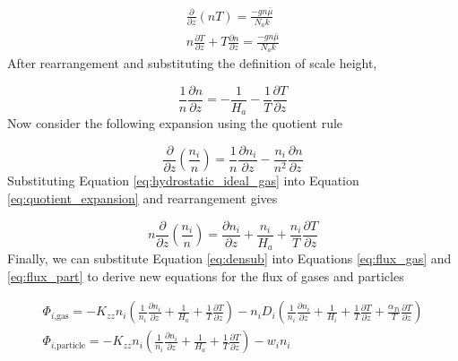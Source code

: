 \begin{gather}
  \frac{\partial}{\partial z} (n T) = \frac{-g n \bar \mu}{N_a k} \\
  n \frac{\partial T}{\partial z} + T \frac{\partial n}{\partial z} = \frac{-g n \bar \mu}{N_a k}
\end{gather}
After rearrangement and substituting the definition of scale height,

\begin{equation}
  \frac{1}{n} \frac{\partial n}{\partial z} = - \frac{1}{H_a} - \frac{1}{T} \frac{\partial T}{\partial z} \label{eq:hydrostatic_ideal_gas}
\end{equation}
Now consider the following expansion using the quotient rule

\begin{equation}
  \frac{\partial }{\partial z} \left(\frac{n_i}{n}\right) = \frac{1}{n} \frac{\partial n_i}{\partial z} - \frac{n_i}{n^2} \frac{\partial n}{\partial z} \label{eq:quotient_expansion}
\end{equation}
Substituting Equation \eqref{eq:hydrostatic_ideal_gas} into Equation \eqref{eq:quotient_expansion} and rearrangement gives

\begin{equation}
  n \frac{\partial }{\partial z} \left(\frac{n_i}{n}\right) = \frac{\partial n_i}{\partial z} + \frac{n_i}{H_a} + \frac{n_i}{T} \frac{\partial T}{\partial z} \label{eq:densub}
\end{equation}
Finally, we can substitute Equation \eqref{eq:densub} into Equations \eqref{eq:flux_gas} and \eqref{eq:flux_part} to derive new equations for the flux of gases and particles

\begin{gather}
  \Phi_{i\text{,gas}} = - K_{zz} n_i \left(\frac{1}{n_i} \frac{\partial n_i}{\partial z} + \frac{1}{H_a} + \frac{1}{T} \frac{\partial T}{\partial z}\right)
  - n_i D_{i} \left( \frac{1}{n_i} \frac{\partial n_i}{\partial z} + \frac{1}{H_i} + \frac{1}{T} \frac{\partial T}{\partial z}  + \frac{\alpha_{Ti}}{T} \frac{\partial T}{\partial z} \right) \label{eq:flux_gas1} 
  \\
  \Phi_{i\text{,particle}} = - K_{zz} n_i \left(\frac{1}{n_i} \frac{\partial n_i}{\partial z} + \frac{1}{H_a} + \frac{1}{T} \frac{\partial T}{\partial z}\right)
  - w_i n_i \label{eq:flux_part1}
\end{gather}


